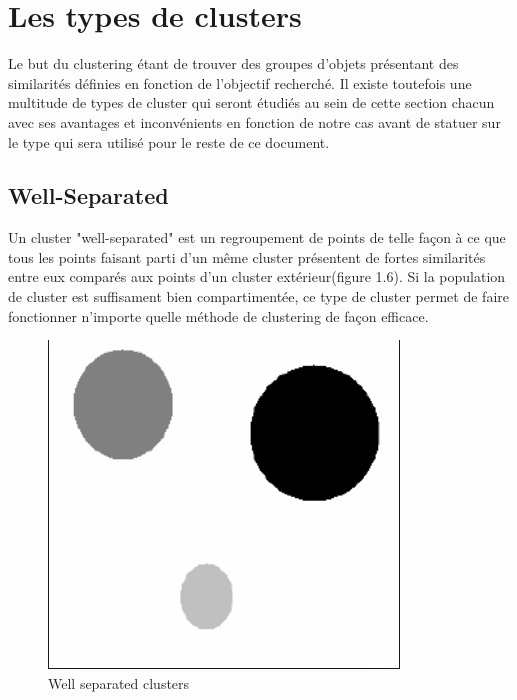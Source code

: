 \documentclass[memoire.tex]{subfiles}
\begin{document}
\section{Les types de clusters}

Le but du clustering étant de trouver des groupes d'objets présentant des similarités
définies en fonction de l'objectif recherché. Il existe toutefois une multitude de types de cluster qui seront étudiés au sein de cette section chacun avec ses avantages et inconvénients en fonction de notre cas avant de statuer sur le type qui sera utilisé pour le reste de ce document.

\subsection{Well-Separated}
Un cluster "well-separated" est un regroupement de points de telle façon à ce que tous les points faisant parti d'un même cluster présentent de fortes similarités entre eux comparés aux points d'un cluster extérieur(figure 1.6). Si la population de cluster est suffisament bien compartimentée, ce type de cluster permet de faire fonctionner n'importe quelle méthode de clustering de façon efficace.
	\begin{figure}[h!]
		\centerline{\includegraphics[scale=0.8]{img/well_separated.png}}
		\caption{Well separated clusters}
	\end{figure}
\end{document}
